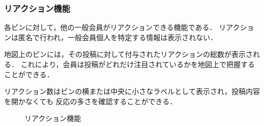 \subsubsection{リアクション機能}
各ピンに対して，他の一般会員がリアクションできる機能である．
リアクションは匿名で行われ，一般会員個人を特定する情報は表示されない．

地図上のピンには，その投稿に対して付与されたリアクションの総数が表示される．
これにより，会員は投稿がどれだけ注目されているかを地図上で把握することができる．

リアクション数はピンの横または中央に小さなラベルとして表示され，投稿内容を開かなくても
反応の多さを確認することができる．

\begin{figure}[H]
    \centering
    
    \caption{リアクション機能}
    \label{fig:pinReaction_gene}
\end{figure}